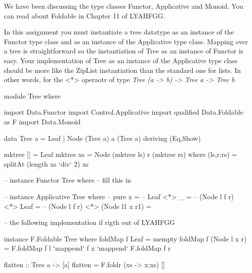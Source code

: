 \documentclass[11pt]{article}
\begin{document}

We have been discussing the type classes Functor, Applicative and Monoid.  You can read about Foldable in Chapter 11 of LYAHFGG.

In this assignment you must instantiate a tree datatype as an instance
of the Functor type class and as an instance of the Applicative type
class.  Mapping over a tree is straightforward so the instantiation of
Tree as an instance of Functor is easy.  Your implementation of Tree
as an instance of the Applicative type class should be more like the
ZipList instantiation than the standard one for lists. In other words,
for the <*> operaotr of type {\it{Tree (a -> b) -> Tree a -> Tree b}}

module Tree where

import Data.Functor
import Control.Applicative
import qualified Data.Foldable  as F
import Data.Monoid


data Tree a = Leaf | Node (Tree a) a (Tree a)  deriving (Eq,Show)

mktree [] = Leaf
mktree xs = Node (mktree ls) r (mktree rs)
  where (ls,r:rs) = splitAt (length xs `div` 2) xs

-- instance Functor Tree where
  -- fill this in


-- instance Applicative Tree where
--   pure x = 
--   Leaf <*> _ = 
--   (Node l f r) <*> Leaf = 
--   (Node l f r) <*> (Node l1 x r1)  = 


-- the following implementation if rigth out of LYAHFGG

instance F.Foldable Tree where
  foldMap f Leaf = mempty
  foldMap f (Node l x r) =  F.foldMap f l `mappend` f x `mappend` F.foldMap f r

flatten :: Tree a -> [a]
flatten = F.foldr (\x xs -> x:xs) []
\end{document}
